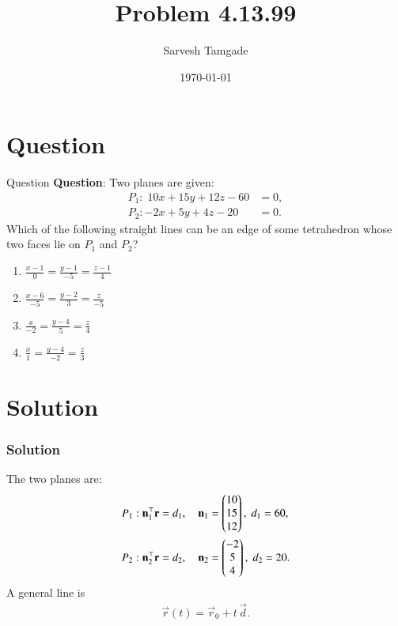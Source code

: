 \documentclass{beamer}
\title{Problem 4.13.99}
\author{Sarvesh Tamgade}
\date{\today}
\numberwithin{equation}{section}
\begin{document}
\begin{frame}
\titlepage
\end{frame}

\section{Question}
\begin{frame}{Question}
\textbf{Question}:
Two planes are given:
\begin{align}
P_{1}:\;10x + 15y + 12z - 60 &= 0,\\
P_{2}:-2x + 5y + 4z - 20 &= 0.
\end{align}
Which of the following straight lines can be an edge of some tetrahedron whose two faces lie on $P_{1}$ and $P_{2}$?
\begin{enumerate}[label=(\alph*)]
  \item $\displaystyle \frac{x-1}{0} = \frac{y-1}{-5} = \frac{z-1}{4}$
  \item $\displaystyle \frac{x-6}{-5} = \frac{y-2}{3} = \frac{z}{-5}$
  \item $\displaystyle \frac{x}{-2} = \frac{y-4}{5} = \frac{z}{4}$
  \item $\displaystyle \frac{x}{1} = \frac{y-4}{-2} = \frac{z}{3}$
\end{enumerate}
\end{frame}

\section{Solution}
\begin{frame}[fragile]
    \frametitle{Solution}
The two planes are:
\begin{align}
P_{1}:&\;\mathbf{n}_{1}^\top \mathbf{r} = d_{1}, 
\quad \mathbf{n}_{1} = \begin{pmatrix}10 \\ 15 \\ 12\end{pmatrix},\; d_{1} = 60,\\
P_{2}:&\;\mathbf{n}_{2}^\top \mathbf{r} = d_{2}, 
\quad \mathbf{n}_{2} = \begin{pmatrix}-2 \\ 5 \\ 4\end{pmatrix},\; d_{2} = 20.
\end{align}
A general line is
\begin{align}
\vec{r}(t) = \vec{r}_{0} + t\,\vec{d}.
\end{align}

\end{frame}
\end{document}
